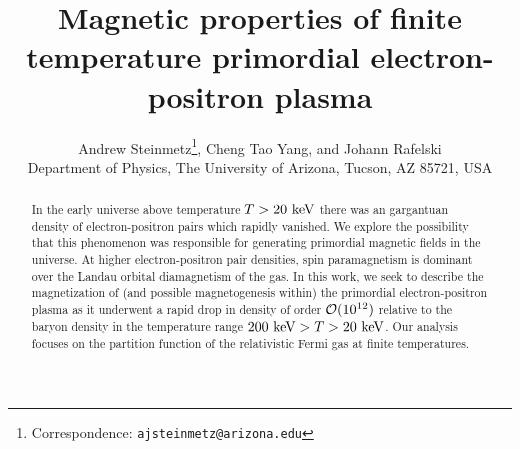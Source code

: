 \documentclass[a4paper]{article}
\title{\boldmath Magnetic properties of finite temperature primordial electron-positron plasma}
\author{Andrew Steinmetz\orc{\orcC}\thanks{Correspondence: \texttt{ajsteinmetz@arizona.edu}}, Cheng Tao Yang\orc{\orcB}, and Johann Rafelski\orc{\orcA}\\ Department of Physics, The University of Arizona, Tucson, AZ 85721, USA}
\begin{document}
\maketitle

\begin{abstract}
    In the early universe above temperature $T>20\text{ keV}$ there was an gargantuan density of electron-positron pairs which rapidly vanished. We explore the possibility that this phenomenon was responsible for generating primordial magnetic fields in the universe. At higher electron-positron pair densities, spin paramagnetism is dominant over the Landau orbital diamagnetism of the gas. In this work, we seek to describe the magnetization of (and possible magnetogenesis within) the primordial electron-positron plasma as it underwent a rapid drop in density of order ${\cal O}(10^{12})$ relative to the baryon density in the temperature range $200\text{ keV}>T>20\text{ keV}$. Our analysis focuses on the partition function of the relativistic Fermi gas at finite temperatures.
\end{abstract}


\end{document}
